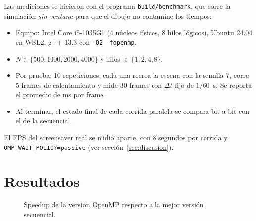 \documentclass[11pt,letterpaper]{article}
\newcommand{\codigo}[1]{\texttt{#1}}
\begin{document}
Las mediciones se hicieron con el programa \codigo{build/benchmark}, que corre
la simulación \emph{sin ventana} para que el dibujo no contamine los tiempos:
\begin{itemize}
  \item Equipo: Intel Core i5-1035G1 (4 núcleos físicos, 8 hilos lógicos),
  Ubuntu 24.04 en WSL2, g++ 13.3 con \codigo{-O2 -fopenmp}.
  \item $N \in \{500, 1000, 2000, 4000\}$ y hilos $\in \{1, 2, 4, 8\}$.
  \item Por prueba: 10 repeticiones; cada una recrea la escena con la semilla
  7, corre 5 frames de calentamiento y mide 30 frames con $\Delta t$ fijo de
  $1/60$~s. Se reporta el promedio de ms por frame.
  \item Al terminar, el estado final de cada corrida paralela se compara bit a
  bit con el de la secuencial.
\end{itemize}
El FPS del screensaver real se midió aparte, con 8 segundos por corrida y
\codigo{OMP\_WAIT\_POLICY=passive} (ver sección~\ref{sec:discusion}).

\section{Resultados}

\begin{table}[H]
  \centering
  \caption{Tiempo de simulación por frame, speedup contra la mejor versión
  secuencial ($S$ sec), contra OpenMP con un hilo ($S$ 1h) y eficiencia $E$.}
  \label{tab:resumen}
  \small
  
\end{table}

\begin{figure}[H]
  \centering
  \caption{Speedup de la versión OpenMP respecto a la mejor versión secuencial.}
  \label{fig:speedup}
\end{figure}
\end{document}
